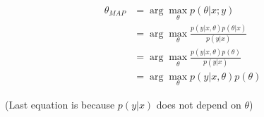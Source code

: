 \begin{answer}
	\begin{align}
	\theta_{MAP} &= \arg \max_{\theta} p(\theta|x;y) \\
	&= \arg \max_{\theta} \frac{p(y|x,\theta)p(\theta|x)}{p(y|x)} \\
	&= \arg \max_{\theta} \frac{p(y|x,\theta)p(\theta)}{p(y|x)} \\
	&= \arg \max_{\theta} p(y|x,\theta)p(\theta)
	\end{align}
	
	(Last equation is because $p(y|x)$ does not depend on $\theta$)
\end{answer}
